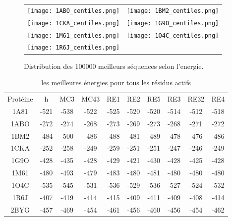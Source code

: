    \begin{figure}[t]
     \centering
     \begin{tabular}{cc}
       \texttt{[image: 1ABO\_centiles.png]} &
       \texttt{[image: 1BM2\_centiles.png]} \\
       \texttt{[image: 1CKA\_centiles.png]} &
       \texttt{[image: 1G9O\_centiles.png]} \\
       \texttt{[image: 1M61\_centiles.png]} &
       \texttt{[image: 1O4C\_centiles.png]} \\
       \texttt{[image: 1R6J\_centiles.png]} \\
     \end{tabular}
     
     \caption{Distribution des 100000 meilleurs séquences selon l'energie.}
     \label{fig-seqlogo-T=03}
   \end{figure}
 


    \begin{table}[h]
      \centering

      \begin{tabular}{cccccccccc}

        \toprule
        Protéine & h & MC3 & MC43 & RE1 & RE2 & RE5 & RE3 & RE32 & RE4 \\
        \cmidrule{1-10}
        1A81 & -521 & -538 & -522 & -525 & -520 & -520 & -514 & -512 & -518 \\
        1ABO & -272 & -274 & -268 & -273 & -269 & -273 & -268 & -271 & -272 \\
        1BM2 & -484 & -500 & -486 & -488 & -481 & -489 & -478 & -476 & -486 \\
        1CKA & -252 & -258 & -249 & -259 & -251 & -251 & -247 & -246 & -249 \\
        1G9O & -428 & -435 & -428 & -429 & -421 & -430 & -428 & -425 & -428 \\
        1M61 & -480 & -493 & -479 & -483 & -480 & -481 & -480 & -480 & -480 \\
        1O4C & -535 & -545 & -531 & -536 & -529 & -536 & -527 & -524 & -532 \\
        1R6J & -407 & -419 & -414 & -415 & -409 & -411 & -409 & -408 & -414 \\
        2BYG & -457 & -469 & -454 & -461 & -456 & -460 & -456 & -454 & -462 \\
  
        \bottomrule

      \end{tabular}      
      \caption{les meilleures énergies pour tous les résidus actifs}
\label{tab:best_ener_all_all}      
    \end{table}


